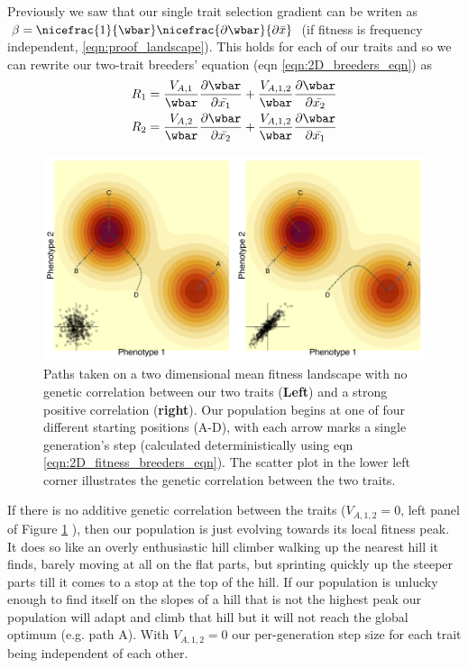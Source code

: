 Previously we saw that our single trait selection gradient can be
writen as $\beta= \nicefrac{1}{\wbar} \nicefrac{\partial
  \wbar}{\partial \bar{x}} $ (if fitness is frequency independent,
\eqn \eqref{eqn:proof_landscape}). This holds for each of our traits and so we can rewrite our two-trait breeders' equation (eqn \eqref{eqn:2D_breeders_eqn}) as
\begin{eqnarray}
R_1 & = \frac{V_{A,1}}{\wbar}  \frac{\partial \wbar}{\partial \bar{x_1}} + \frac{ V_{A,1,2}}{\wbar}  \frac{\partial \wbar}{\partial \bar{x_2}}  \nonumber \\
R_2 & = \frac{V_{A,2}}{\wbar}  \frac{\partial \wbar}{\partial \bar{x_2}}   +  \frac{ V_{A,1,2}}{\wbar}  \frac{\partial \wbar}{\partial \bar{x_1}}\label{eqn:2D_fitness_breeders_eqn}
\end{eqnarray}

\begin{figure}
\begin{center}
\includegraphics[width=\textwidth]{figures/Response_to_sel/fitness_landscape_2D.png}
\end{center}
\caption{Paths taken on a two dimensional mean fitness landscape with
  no genetic correlation between our two traits ({\bf Left}) and a
  strong positive correlation ({\bf right}). Our
  population begins at one of four different starting positions
  (A-D), with each arrow marks a single generation's step (calculated
  deterministically using eqn
  \eqref{eqn:2D_fitness_breeders_eqn}). The scatter plot in the lower
  left corner illustrates the genetic correlation between the two traits.} \label{fig:MV_fitness_landscape} 
\end{figure}

If there is no additive genetic correlation between the traits ($
V_{A,1,2}=0$, left panel of Figure \ref{fig:MV_fitness_landscape} ),
then our population is just evolving towards its local fitness peak.
It does so like an overly enthusiastic hill climber walking up the
nearest hill it finds, barely moving at all on the flat parts, but
sprinting quickly up the steeper parts till it comes to a stop at the
top of the hill. If our population is unlucky enough to find itself on
the slopes of a hill that is not the highest peak our population will
adapt and climb that hill but it will not reach the global optimum
(e.g. path A). With $V_{A,1,2}=0$  our per-generation step size for each trait being independent of
each other. 

